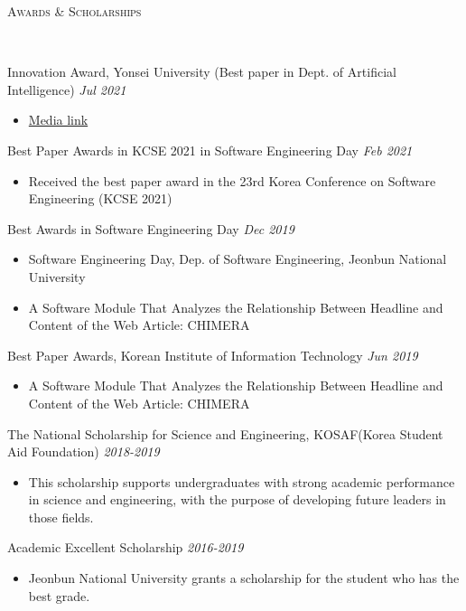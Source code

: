 \documentclass[10pt]{article}
\newenvironment{changemargin}[2]{
  \begin{list}{}{
    \setlength{\topsep}{0pt}
    \setlength{\leftmargin}{#1}
    \setlength{\rightmargin}{#2}
    \setlength{\listparindent}{\parindent}
    \setlength{\itemindent}{\parindent}
    \setlength{\parsep}{\parskip}
  }
  \item[]}{\end{list}
}
\newcommand{\lineover}{
	\begin{changemargin}{-0.05in}{-0.05in}
		\vspace*{-8pt}
		\hrulefill \\
		\vspace*{-2pt}
	\end{changemargin}
}
\newcommand{\header}[1]{
	\begin{changemargin}{-0.5in}{-0.5in}
		\scshape{#1}\\
  	\lineover
	\end{changemargin}
}
\newcommand{\award}[2]{
	{#1} \hfill \emph{#2}\\ \medskip
}
\newenvironment{body} {
	\vspace*{-16pt}
	\begin{changemargin}{-0.25in}{-0.5in}
  }
	{\end{changemargin}
}
\begin{document}
\medskip
\pagebreak

\header{Awards \& Scholarships}

\begin{body}
	\vspace{14pt}

\award{Innovation Award, Yonsei University (Best paper in Dept. of Artificial Intelligence)}{Jul 2021}
	\begin{itemize} \itemsep -0pt  %
		\item \href{https://www.yonsei.ac.kr/ocx/news.jsp?mode=view&ar_seq=20220708141917269049&sr_volume=632&list_mode=list&sr_site=S&pager.offset=0&sr_cates=29}{Media link}
  	\end{itemize}
\award{Best Paper Awards in KCSE 2021 in Software Engineering Day}{Feb 2021}
	\begin{itemize} \itemsep -0pt  %
		\item Received the best paper award in the 23rd Korea Conference on Software Engineering (KCSE 2021)
  	\end{itemize}
\award{Best Awards in Software Engineering Day}{Dec 2019}
	\begin{itemize} \itemsep -0pt  %
		\item Software Engineering Day, Dep. of Software Engineering, Jeonbun National University
		\item A Software Module That Analyzes the Relationship Between Headline and Content of the Web Article: CHIMERA
  	\end{itemize}
\award{Best Paper Awards, Korean Institute of Information Technology}{Jun 2019}
	\begin{itemize} \itemsep -0pt  %
		\item A Software Module That Analyzes the Relationship Between Headline and Content of the Web Article: CHIMERA
  	\end{itemize}
\award{The National Scholarship for Science and Engineering, KOSAF(Korea Student Aid Foundation)}{2018-2019}
    \begin{itemize} \itemsep -0pt  %
      \item This scholarship supports undergraduates with strong academic performance in science and engineering, with the purpose of developing future leaders in those fields.
  	\end{itemize}
\award{Academic Excellent Scholarship}{2016-2019}
    \begin{itemize} \itemsep -0pt  %
      \item Jeonbun National University grants a scholarship for the student who has the best grade.
  	\end{itemize}

\end{body}
\end{document}
